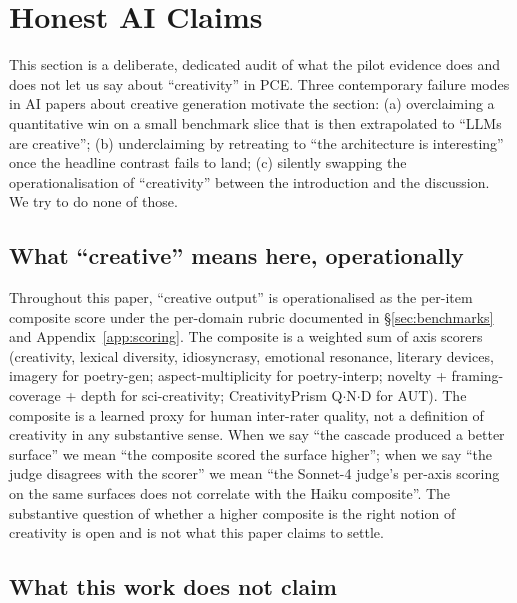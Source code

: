 \section{Honest AI Claims}\label{sec:honest_ai_claims}

This section is a deliberate, dedicated audit of what the pilot evidence does and does not let us say about ``creativity'' in PCE. Three contemporary failure modes in AI papers about creative generation motivate the section: (a) overclaiming a quantitative win on a small benchmark slice that is then extrapolated to ``LLMs are creative''; (b) underclaiming by retreating to ``the architecture is interesting'' once the headline contrast fails to land; (c) silently swapping the operationalisation of ``creativity'' between the introduction and the discussion. We try to do none of those.

\subsection{What ``creative'' means here, operationally}

Throughout this paper, ``creative output'' is operationalised as the per-item composite score under the per-domain rubric documented in \S\ref{sec:benchmarks} and Appendix~\ref{app:scoring}. The composite is a weighted sum of axis scorers (creativity, lexical diversity, idiosyncrasy, emotional resonance, literary devices, imagery for poetry-gen; aspect-multiplicity for poetry-interp; novelty + framing-coverage + depth for sci-creativity; CreativityPrism Q$\cdot$N$\cdot$D for AUT). The composite is a learned proxy for human inter-rater quality, not a definition of creativity in any substantive sense. When we say ``the cascade produced a better surface'' we mean ``the composite scored the surface higher''; when we say ``the judge disagrees with the scorer'' we mean ``the Sonnet-4 judge's per-axis scoring on the same surfaces does not correlate with the Haiku composite''. The substantive question of whether a higher composite is the right notion of creativity is open and is not what this paper claims to settle.

\subsection{What this work does not claim}


